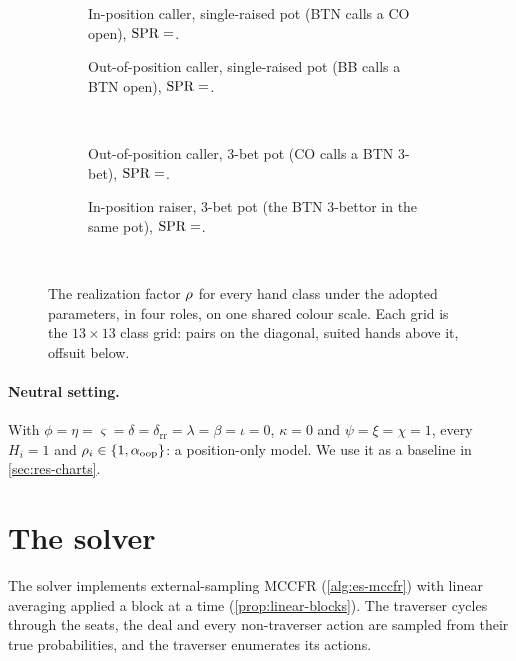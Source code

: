\begin{figure}[ht]
\centering
%
\begin{subfigure}[t]{0.48\linewidth}\centering
  \caption{In-position caller, single-raised pot (BTN calls a CO open), $\spr = \heatspr{ip_caller_srp}$.}\end{subfigure}\hfill
\begin{subfigure}[t]{0.48\linewidth}\centering
  \caption{Out-of-position caller, single-raised pot (BB calls a BTN open), $\spr = \heatspr{oop_caller_srp}$.}\end{subfigure}\\[2mm]
\begin{subfigure}[t]{0.48\linewidth}\centering
  \caption{Out-of-position caller, 3-bet pot (CO calls a BTN 3-bet), $\spr = \heatspr{oop_caller_3bp}$.}\end{subfigure}\hfill
\begin{subfigure}[t]{0.48\linewidth}\centering
  \caption{In-position raiser, 3-bet pot (the BTN 3-bettor in the same pot), $\spr = \heatspr{ip_raiser_3bp}$.}\end{subfigure}\\[2mm]

\caption{The realization factor $\rho$ for every hand class under the adopted parameters, in four roles, on one shared colour scale. Each grid is the $13\times 13$ class grid: pairs on the diagonal, suited hands above it, offsuit below.}
\label{fig:real-grids}
\end{figure}

\paragraph{Neutral setting.} With $\phi = \eta = \varsigma = \delta = \delta_{\mathrm{rr}} = \lambda = \beta = \iota = 0$, $\kappa = 0$ and $\psi = \xi = \chi = 1$, every $H_i = 1$ and $\rho_i \in \{1, \alpha_{\mathrm{oop}}\}$: a position-only model. We use it as a baseline in \cref{sec:res-charts}.

\section{The solver}\label{sec:solver}

The solver implements external-sampling MCCFR (\cref{alg:es-mccfr}) with linear averaging applied a block at a time (\cref{prop:linear-blocks}). The traverser cycles through the seats, the deal and every non-traverser action are sampled from their true probabilities, and the traverser enumerates its actions.

